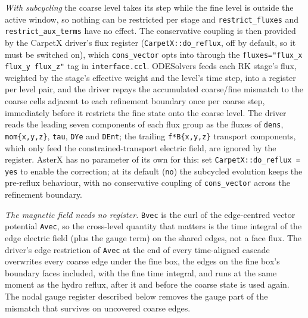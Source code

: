 \emph{With subcycling} the coarse level takes its step while the fine level
is outside the active window, so nothing can be restricted per stage and
\texttt{restrict\_fluxes} and \texttt{restrict\_aux\_terms} have no effect.
The conservative coupling is then provided by the CarpetX driver's flux register (\texttt{CarpetX::do\_reflux},
off by default, so it must be switched on), which \texttt{cons\_vector} opts into through the
\texttt{fluxes="flux\_x flux\_y flux\_z"} tag in \texttt{interface.ccl}.
ODESolvers feeds each RK stage's flux, weighted by the stage's effective
weight and the level's time step, into a register per level pair, and the
driver repays the accumulated coarse/fine mismatch to the coarse cells
adjacent to each refinement boundary once per coarse step, immediately
before it restricts the fine state onto the coarse level. The driver reads
the leading seven components of each flux group as the fluxes of
\texttt{dens}, \texttt{mom\{x,y,z\}}, \texttt{tau}, \texttt{DYe} and
\texttt{DEnt}; the trailing \texttt{f*B\{x,y,z\}} transport components,
which only feed the constrained-transport electric field, are ignored by the
register. AsterX has no parameter of its own for this: set
\texttt{CarpetX::do\_reflux = yes} to enable the correction; at its default
(\texttt{no}) the subcycled evolution keeps the pre-reflux behaviour, with
no conservative coupling of \texttt{cons\_vector} across the refinement
boundary.

\emph{The magnetic field needs no register.} \texttt{Bvec} is the curl of
the edge-centred vector potential \texttt{Avec}, so the cross-level quantity
that matters is the time integral of the edge electric field (plus the gauge
term) on the shared edges, not a face flux. The driver's edge restriction of
\texttt{Avec} at the end of every time-aligned cascade overwrites every
coarse edge under the fine box, the edges on the fine box's boundary faces
included, with the fine time integral, and runs at the same moment as the
hydro reflux, after it and before the coarse state is used again. The nodal
gauge register described below removes the gauge part of the mismatch that
survives on uncovered coarse edges.

